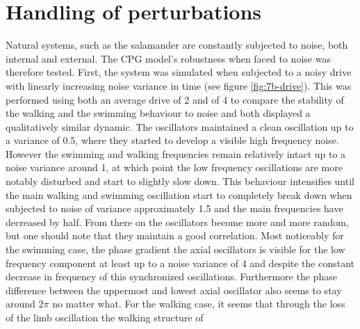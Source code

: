 \documentclass[a4paper]{scrartcl}
\begin{document}
{\section{Handling of perturbations}
Natural systems, such as the salamander are constantly subjected to noise, both internal and external. The CPG model's robustness when faced to noise was therefore tested. First, the system was simulated when subjected to a noisy drive with linearly increasing noise variance in time (see figure \ref{fig:7b-drive}). This was performed using both an average drive of 2 and of 4 to compare the stability of the walking and the swimming behaviour to noise and both displayed a qualitatively similar dynamic. The oscillators maintained a clean oscillation up to a variance of 0.5, where they started to develop a visible high frequency noise. However the swimming and walking frequencies remain relatively intact up to a noise variance around 1, at which point the low frequency oscillations are more notably disturbed and start to slightly slow down. This behaviour intensifies until the main walking and swimming oscillation start to completely break down when subjected to noise of variance approximately 1.5 and the main frequencies have decreased by half. From there on the oscillators become more and more random, but one should note that they maintain a good correlation. Most noticeably for the swimming case, the phase gradient the axial oscillators is visible for the low frequency component at least up to a noise variance of 4 and despite the constant decrease in frequency of this synchronized oscillations. Furthermore the phase difference between the uppermost and lowest axial oscillator also seems to stay around $2\pi$ no matter what. For the walking case, it 
seems that through the loss of the limb oscillation the walking structure of 

}
\end{document}
